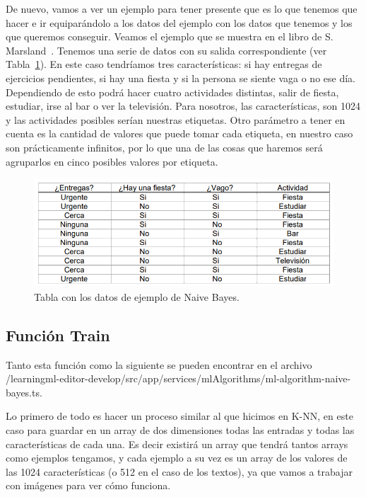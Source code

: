 \documentclass[a4paper, 12pt]{book}
\begin{document}
De nuevo, vamos a ver un ejemplo para tener presente que es lo que tenemos que hacer e ir equiparándolo a los datos del ejemplo con los datos que tenemos y los que queremos conseguir. Veamos el ejemplo que se muestra en el libro de S. Marsland~\cite{machinelearning}. Tenemos una serie de datos con su salida correspondiente (ver Tabla~\ref{fig:tablabayes}).
En este caso tendríamos tres características: si hay entregas de ejercicios pendientes, si hay una fiesta y si la persona se siente vaga o no ese día. Dependiendo de esto podrá hacer cuatro actividades distintas, salir de fiesta, estudiar, irse al bar o ver la televisión. 
Para nosotros, las características, son 1024 y las actividades posibles serían nuestras etiquetas. Otro parámetro a tener en cuenta es la cantidad de valores que puede tomar cada etiqueta, en nuestro caso son prácticamente infinitos, por lo que una de las cosas que haremos será agruparlos en cinco posibles valores por etiqueta. 

\begin{figure}
	\centering
	\includegraphics[width=12cm, keepaspectratio]{img/tablabayes}
	\caption{Tabla con los datos de ejemplo de Naive Bayes.}			
	\label{fig:tablabayes}
\end{figure}



\subsection{Función Train} 
\label{sec:funciontrainbayes}

Tanto esta función como la siguiente se pueden encontrar en el archivo /learningml-editor-develop/src/app/services/mlAlgorithms/ml-algorithm-naive-bayes.ts.

Lo primero de todo es hacer un proceso similar al que hicimos en K-NN, en este caso para guardar en un array de dos dimensiones todas las entradas y todas las características de cada una. Es decir existirá un array que tendrá tantos arrays como ejemplos tengamos, y cada ejemplo a su vez es un array de los valores de las 1024 características (o 512 en el caso de los textos), ya que vamos a trabajar con imágenes para ver cómo funciona.
\end{document}
